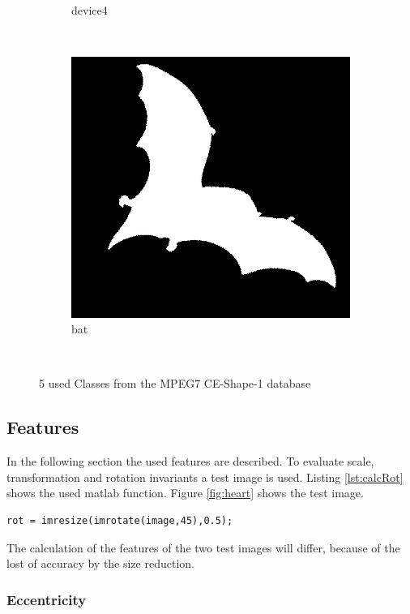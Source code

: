 \documentclass[a4paper,psfig,subfigure,epsfig,fleqn,amssmb,float,caption,fontenc,ausarbeitung]{article}
\begin{document}
\begin{figure}
\begin{subfigure}[b]{0.3\textwidth}
		\caption{device4}
	\end{subfigure}
	~
	\begin{subfigure}[b]{0.3\textwidth}
		\includegraphics[width=\textwidth]{img/bat}
		\caption{bat}
	\end{subfigure}
	~
	\caption{5 used Classes from the MPEG7 CE-Shape-1 database \cite{latecki2000shape}}
	\label{fig:classes}
\end{figure}


\subsection{Features}
\label{sec:features}

In the following section the used features are described. To evaluate scale, 
transformation and rotation invariants a test image is used. Listing 
\ref{lst:calcRot} shows the used matlab function. Figure \ref{fig:heart} 
shows the test image. 

\begin{lstlisting}[caption=Calculate rotated image, label=lst:calcRot]
	rot = imresize(imrotate(image,45),0.5);
\end{lstlisting}
The calculation of the features of the two test images will differ, because 
of the lost of accuracy by the size reduction.

\subsubsection{Eccentricity}
\label{sec:eccentricity}
\end{document}
